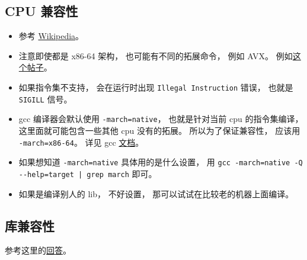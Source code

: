 
\begin{issues}
\issueDraft
\end{issues}


\subsection{CPU 兼容性}

\begin{itemize}
\item 参考 \href{https://en.wikipedia.org/wiki/Binary-code_compatibility}{Wikipedia}。
\item 注意即使都是 x86-64 架构， 也可能有不同的拓展命令， 例如 AVX。 例如\href{https://stackoverflow.com/questions/50945287/illegal-instruction-when-run-precompiled-program-on-other-machine}{这个帖子}。
\item 如果指令集不支持， 会在运行时出现 \verb`Illegal Instruction` 错误， 也就是 \verb`SIGILL` 信号。
\item gcc 编译器会默认使用 \verb`-march=native`， 也就是针对当前 cpu 的指令集编译， 这里面就可能包含一些其他 cpu 没有的拓展。 所以为了保证兼容性， 应该用 \verb`-march=x86-64`。 详见 gcc \href{https://gcc.gnu.org/onlinedocs/gcc/x86-Options.html}{文档}。
\item 如果想知道 \verb`-march=native` 具体用的是什么设置， 用 \verb`gcc -march=native -Q --help=target | grep march` 即可。
\item 如果是编译别人的 lib， 不好设置， 那可以试试在比较老的机器上面编译。
\end{itemize}

\subsection{库兼容性}
参考这里的\href{https://stackoverflow.com/questions/20183883/determining-binary-compatibility-under-linux}{回答}。

